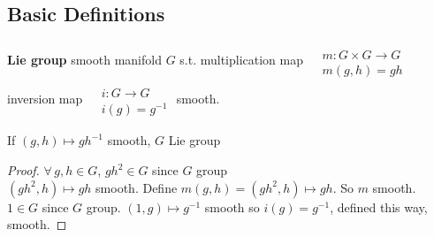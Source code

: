 %
% 
% 

\subsection*{Basic Definitions}

\textbf{Lie group} smooth manifold $G$ s.t. multiplication map $\begin{aligned} & \quad \\ 
  & m : G \times G \to G \\
  & m(g,h) = gh \end{aligned}$ \\
inversion map $\begin{aligned} & \quad \\ 
  & i : G \to G \\
  & i(g) = g^{-1} \end{aligned}$ 
smooth.

\begin{proposition}[7.1]
If $(g,h) \mapsto gh^{-1}$ smooth, $G$ Lie group
\end{proposition}
\begin{proof}
  $\forall \, g,h \in G$, $gh^2 \in G$ since $G$ group \\
$(gh^2,h) \mapsto gh$ smooth.  Define $m(g,h) = (gh^2,h) \mapsto gh$.  So $m$ smooth.  \\
$1\in G$ since $G$ group.  $(1,g) \mapsto g^{-1}$ smooth so $i(g) = g^{-1}$, defined this way, smooth.  
\end{proof}

